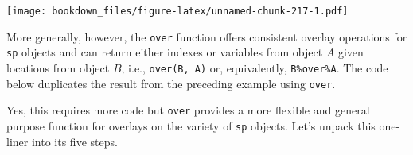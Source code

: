 \documentclass[]{krantz}
\makeatletter
\newenvironment{Shaded}{\begin{snugshade}}{\end{snugshade}}
\newcommand{\KeywordTok}[1]{\textcolor[rgb]{0.27,0.27,0.27}{\textbf{#1}}}
\newcommand{\StringTok}[1]{\textcolor[rgb]{0.5,0.5,0.5}{#1}}
\newcommand{\OperatorTok}[1]{\textcolor[rgb]{0.43,0.43,0.43}{\textbf{#1}}}
\newcommand{\NormalTok}[1]{#1}
\newenvironment{kframe}{%
\medskip{}
\setlength{\fboxsep}{.8em}
 \def\at@end@of@kframe{}%
 \ifinner\ifhmode%
  \def\at@end@of@kframe{\end{minipage}}%
  \begin{minipage}{\columnwidth}%
 \fi\fi%
 \def\FrameCommand##1{\hskip\@totalleftmargin \hskip-\fboxsep
 \colorbox{shadecolor}{##1}\hskip-\fboxsep
     \hskip-\linewidth \hskip-\@totalleftmargin \hskip\columnwidth}%
 \MakeFramed {\advance\hsize-\width
   \@totalleftmargin\z@ \linewidth\hsize
   \@setminipage}}%
 {\par\unskip\endMakeFramed%
 \at@end@of@kframe}
\renewenvironment{Shaded}{\begin{kframe}}{\end{kframe}}
\makeatother
\begin{document}
\texttt{[image: bookdown\_files/figure-latex/unnamed-chunk-217-1.pdf]}

More generally, however, the \texttt{over} function offers consistent
overlay operations for \texttt{sp} objects and can return either indexes
or variables from object \(A\) given locations from object \(B\), i.e.,
\texttt{over(B,\ A)} or, equivalently, \texttt{B\%over\%A}. The code
below duplicates the result from the preceding example using
\texttt{over}.

\begin{Shaded}
\end{Shaded}

Yes, this requires more code but \texttt{over} provides a more flexible
and general purpose function for overlays on the variety of \texttt{sp}
objects. Let's unpack this one-liner into its five steps.

\begin{Shaded}
\end{Shaded}
\end{document}
